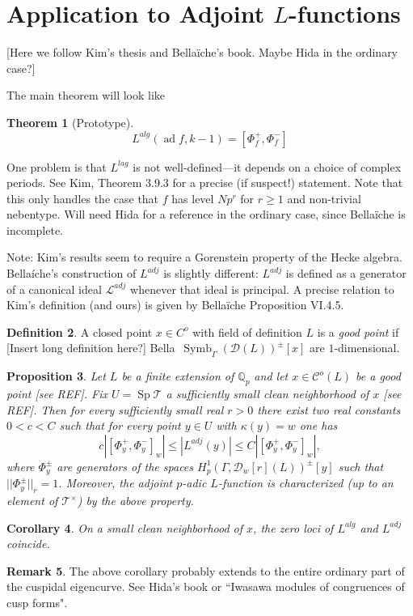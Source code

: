\documentclass[10pt]{amsart}
\theoremstyle{plain}
\newtheorem{theorem}{Theorem}[section]
\newtheorem{proposition}[theorem]{Proposition}
\newtheorem{corollary}[theorem]{Corollary}
\theoremstyle{definition}
\newtheorem{definition}[theorem]{Definition}
\newtheorem{remark}[theorem]{Remark}
\newcommand{\QQ}{{\mathbb{Q}}}
\newcommand{\cD}{\mathcal{D}}
\DeclareMathOperator{\Symb}{Symb}
\DeclareMathOperator{\ad}{ad}
\DeclareMathOperator{\Sp}{Sp}
\begin{document}
\section{Application to Adjoint $L$-functions} \label{sec:adjoint}

[Here we follow Kim's thesis and Bella\"iche's book. Maybe Hida in the ordinary case?]

The main theorem will look like
\begin{theorem}[Prototype]
\begin{equation}
	L^{alg}(\ad f , k-1) = [\Phi_{f}^+,\Phi_{f}^-]
\end{equation}
\end{theorem}
One problem is that $L^{lag}$ is not well-defined---it depends on a choice of complex periods. See Kim, Theorem 3.9.3 for a precise (if suspect!) statement. Note that this only handles the case that $f$ has level $Np^r$ for $r\geq 1$ and non-trivial nebentype. Will need Hida for a reference in the ordinary case, since Bella\"iche is incomplete.

Note: Kim's results seem to require a Gorenstein property of the Hecke algebra. Bella\'iche's construction of $L^{adj}$ is slightly different: $L^{adj}$ is defined as a generator of a canonical ideal $\mathcal{L}^{adj}$ whenever that ideal is principal. A precise relation to Kim's definition (and ours) is given by Bella\"iche Proposition VI.4.5.

\begin{definition}
A closed point $x\in C^o$ with field of definition $L$ is a \emph{good point} if [Insert long definition here?]
Bella\ $\Symb_\Gamma(\cD(L))^\pm[x]$ are $1$-dimensional.
\end{definition}

\begin{proposition}
Let $L$ be a finite extension of $\QQ_p$ and let $x\in \mathcal{C}^o(L)$ be a good point [see REF]. Fix $U=\Sp\mathcal{T}$ a sufficiently small clean neighborhood of $x$ [see REF]. Then for every sufficiently small real $r>0$ there exist two real constants $0<c<C$ such that for every point $y\in U$ with $\kappa(y)=w$ one has
\begin{equation}
	c| [\Phi_{y}^+, \Phi_y^-]_w | \leq |L^{adj}(y) | \leq C | [\Phi_y^+, \Phi_y^-]_w|,
\end{equation}
where $\Phi_{y}^\pm$ are generators of the spaces $H^1_p(\Gamma,\cD_w[r](L))^{\pm}[y]$ such that $||\Phi_y^\pm||_r = 1$. Moreover, the adjoint $p$-adic $L$-function is characterized (up to an element of $\mathcal{T}^\times$) by the above property.
\end{proposition}

\begin{corollary}
On a small clean neighborhood of $x$, the zero loci of $L^{alg}$ and $L^{adj}$ coincide.
\end{corollary}

\begin{remark}
The above corollary probably extends to the entire ordinary part of the cuspidal eigencurve. See Hida's book or ``Iwasawa modules of congruences of cusp forms".
\end{remark}
\end{document}
